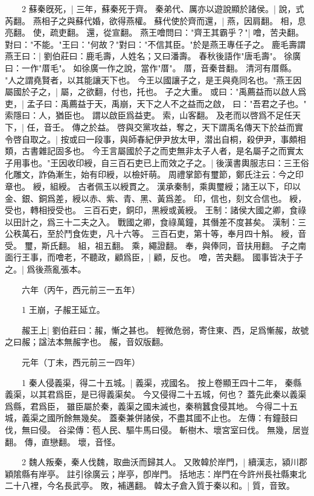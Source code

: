 　　2 蘇秦旣死，|{
	三年，蘇秦死于齊。
}
秦弟代、厲亦以遊說顯於諸侯。|{
	說，式芮翻。
}
燕相子之與蘇代婚，欲得燕權。
	蘇代使於齊而還，|{
	燕，因肩翻。
	相，息亮翻。
	使，疏吏翻。
	還，從宣翻。
}
燕王噲問曰："齊王其霸乎？"|{
	噲，苦夬翻。
}
對曰："不能。"王曰："何故？"對曰："不信其臣。"於是燕王專任子之。
	鹿毛壽謂燕王曰：|{
	劉伯莊曰：鹿毛壽，人姓名；又曰潘壽。
	春秋後語作"唐毛壽"。
	徐廣曰：一作"厝毛"。
	如徐廣一作之說，當作"厝"。
	厝，音秦昔翻。
	清河有厝縣。
}
"人之謂堯賢者，以其能讓天下也。
	今王以國讓子之，是王與堯同名也。"燕王因屬國於子之，|{
	屬，之欲翻，付也，托也。
}
子之大重。
	或曰："禹薦益而以啟人爲吏，|{
	孟子曰：禹薦益于天，禹崩，天下之人不之益而之啟，
	曰："吾君之子也。"
	索隱曰：人，猶臣也。
	謂以啟臣爲益吏。
	索，山客翻。
}
及老而以啓爲不足任天下，|{
	任，音壬。
}
傳之於益。
	啓與交黨攻益，奪之，天下謂禹名傳天下於益而實令啓自取之。|{
	按或曰一段事，與師春紀伊尹放太甲，潜出自桐，殺伊尹，事頗相類，古書雜記固多也。
}
今王言屬國於子之而吏無非太子人者，是名屬子之而實太子用事也。"王因收印綬，自三百石吏已上而效之子之。|{
	後漢書輿服志曰：三王俗化雕文，詐偽漸生，始有印綬，以檢奸萌。
	周禮掌節有璽節，鄭氏注云：今之印章也。
	綬，組綬。
	古者佩玉以綬貫之。
	漢承秦制，乘輿璽綬；諸王以下，印以金、銀、銅爲差，綬以赤、紫、青、黑、黃爲差。
	印，信也，刻文合信也。
	綬，受也，轉相授受也。
	三百石吏，銅印，黑綬或黃綬。
	王制：諸侯大國之卿，食祿以田計之，爲三十二夫之入。
	戰國之卿，食祿萬鐘，其僭差不度甚矣。
	漢制：三公秩萬石，至於鬥食佐吏，凡十六等。
	三百石吏，第十等，奉月四十斛。
	綬，音受。
	璽，斯氏翻。
	組，祖五翻。
	乘，繩證翻。
	奉，與俸同，音扶用翻。
}
子之南面行王事，而噲老，不聽政，顧爲臣，|{
	顧，反也。
	噲，苦夬翻。
}
國事皆决于子之。|{
	爲後燕亂張本。
}

　　六年（丙午，西元前三一五年）

　　1 王崩，子赧王延立。


　　赧王上|{
	劉伯莊曰：赧，慚之甚也。
	輕微危弱，寄住東、西，足爲慚赧，故號之曰赧；諡法本無赧字也。
	赧，音奴版翻。
}

　　元年（丁未，西元前三一四年）

　　1 秦人侵義渠，得二十五城。|{
	義渠，戎國名。
	按上卷顯王四十二年，
	秦縣義渠，以其君爲臣，是已得義渠矣。
	今又侵得二十五城，何也？
	蓋先此秦以義渠爲縣，君爲臣，
	雖臣屬於秦，義渠之國未滅也，秦稍蠶食侵其地。
	今得二十五城，義渠之國所餘無幾矣。
	蓋秦兼併諸侯，不盡其國不止也。
	左傳：有鐘鼓曰伐，無曰侵。
	谷梁傳：苞人民、驅牛馬曰侵。
	斬樹木、壞宮室曰伐。
	無幾，居豈翻。
	傳，直戀翻。
	壞，音怪。
}

　　2 魏人叛秦，秦人伐魏，取曲沃而歸其人。
	又敗韓於岸門，|{
	續漢志，潁川郡穎隂縣有岸亭。
	註引徐廣云；岸亭，卽岸門。
	括地志：岸門在今許州長社縣東北二十八裡，今名長武亭。
	敗，補邁翻。
}
韓太子倉入質于秦以和。|{
	質，音致。
}

